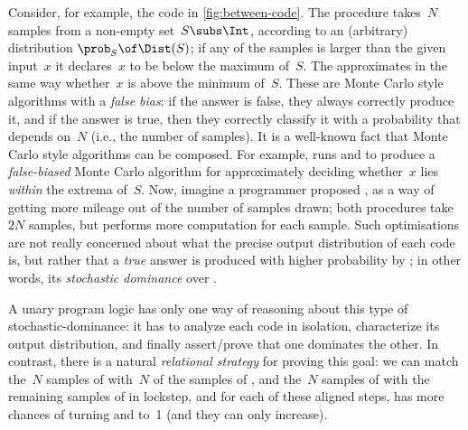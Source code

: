 Consider, for example, the code in
\cref{fig:between-code}.
The  procedure takes~$N$ samples
from a non-empty set~$S \subs \Int$,
according to an (arbitrary) distribution $\prob_S \of \Dist(S)$;
if any of the samples is larger than the given input~$x$
it declares~$x$ to be below the maximum of~$S$.
The  approximates in the same way
whether~$x$ is above the minimum of~$S$.
These are Monte Carlo style algorithms with a \emph{false bias}:
if the answer is false, they always correctly produce it,
and if the answer is true, then they correctly classify it
with a probability that depends on~$N$
(i.e., the number of samples).
It is a well-known fact that Monte Carlo style algorithms can be composed.
For example,  runs
 and 
to produce a \emph{false-biased} Monte Carlo algorithm
for approximately deciding whether~$x$ lies \emph{within} the extrema of~$S$.
Now, imagine a programmer proposed ,
as a way of getting more mileage out of the number of samples drawn;
both procedures take~$2N$ samples,
but  performs more computation for each sample.
Such optimisations are not really concerned about
what the precise output distribution of each code is,
but rather that a \emph{true} answer is produced
with higher probability by ;
in other words, its \emph{stochastic dominance} over .

A unary program logic has only one way of reasoning
about this type of stochastic-dominance:
it has to analyze each code in isolation,
characterize its output distribution,
and finally assert/prove that one dominates the other.
In contrast, there is a natural \emph{relational strategy}
for proving this goal:
we can match the~$N$ samples of 
with~$N$ of the samples of , and the~$N$ samples of 
with the remaining samples of  in lockstep,
and for each of these aligned steps,
 has more chances of turning  and  to~1
(and they can only increase).



